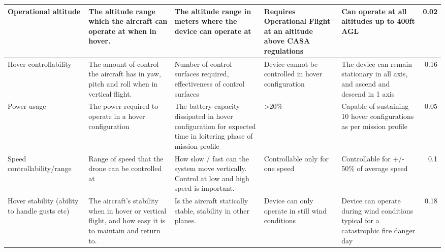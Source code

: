 \begin{table}[]
{\begin{tabular}{|p{2cm}|p{4cm}|p{4cm}|p{4cm}|p{4cm}|r|}
Operational altitude                          & The altitude range which the aircraft can operate at when in hover.                                      & The altitude range in meters where the device can operate at                                                                                                & Requires Operational Flight at an altitude above CASA regulations   & Can operate at all altitudes up to 400ft AGL                                                                            & 0.02      \\ \hline
Hover controllability                         & The amount of control the aircraft has in yaw, pitch and roll when in vertical flight.                   & Number of control surfaces required, effectiveness of control surfaces                                                                                      & Device cannot be controlled in hover configuration                  & The device can remain stationary in all axis, and ascend and descend in 1 axis                                          & 0.16      \\ \hline
Power usage                                   & The power required to operate in a hover configuration                                                   & The battery capacity dissipated in hover configuration for expected time in loitering phase of mission profile & \textgreater{}20\%                                                  & Capable of sustaining 10 hover configurations as per mission profile                                                    & 0.05      \\ \hline
Speed controllability/range                   & Range of speed that the drone can be controlled at                                                       & How slow / fast can the system move vertically. Control at low and high speed is important.                                                                 & Controllable only for one speed                                     & Controllable for +/- 50\% of average speed                                                                              & 0.1       \\ \hline
Hover stability (ability to handle gusts etc) & The aircraft's stability when in hover or vertical flight, and how easy it is to maintain and return to. & Is the aircraft statically stable, stability in other planes.                                                                                               & Device can only operate in still wind conditions                    & Device can operate during wind conditions typical for a catastrophic fire danger day                                    & 0.18      \\ \hline

\end{tabular}}
\end{table}
